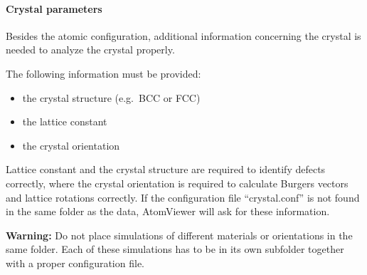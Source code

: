 \documentclass[a4paper,12pt]{scrartcl}
\begin{document}
\paragraph{Crystal parameters}
Besides the atomic configuration, additional information concerning the crystal is needed to analyze the crystal properly.

The following information must be provided:
\begin{itemize}
 \item{the crystal structure (e.g.\ BCC or FCC)}
 \item{the lattice constant}
 \item{the crystal orientation}
\end{itemize}

Lattice constant and the crystal structure are required to identify defects correctly, where the crystal orientation is required to calculate Burgers vectors and lattice rotations correctly.
If the configuration file ``crystal.conf'' is not found in the same folder as the data, AtomViewer will ask for these information.

\textbf{Warning:} Do not place simulations of different materials or orientations in the same folder. Each of these simulations has to be in its own subfolder together with a proper configuration file.
\end{document}

